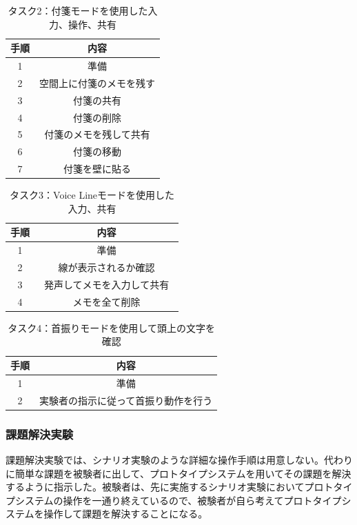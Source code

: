 \documentclass[technicalreport]{ieicej}
\begin{document}
\begin{table}[h]
\caption{タスク2：付箋モードを使用した入力、操作、共有}
\label{table:task2}
\begin{center}
\begin{tabular}{|c|c|}
\hline
手順 & 内容  \\
\hline\hline
1 & 準備  \\
\hline
2 & 空間上に付箋のメモを残す  \\
\hline
3 & 付箋の共有　\\
\hline
4 & 付箋の削除  \\
\hline
5 & 付箋のメモを残して共有  \\
\hline
6 & 付箋の移動　\\
\hline
7 & 付箋を壁に貼る \\
\hline
\end{tabular}
\end{center}
\end{table}

\begin{table}[h]
\caption{タスク3：Voice Lineモードを使用した入力、共有}
\label{table:task3}
\begin{center}
\begin{tabular}{|c|c|}
\hline
手順 & 内容  \\
\hline\hline
1 & 準備  \\
\hline
2 & 線が表示されるか確認  \\
\hline
3 & 発声してメモを入力して共有　\\
\hline
4 & メモを全て削除  \\
\hline
\end{tabular}
\end{center}
\end{table}

\begin{table}[h]
\caption{タスク4：首振りモードを使用して頭上の文字を確認}
\label{table:task4}
\begin{center}
\begin{tabular}{|c|c|}
\hline
手順 & 内容  \\
\hline\hline
1 & 準備  \\
\hline
2 & 実験者の指示に従って首振り動作を行う  \\
\hline
\end{tabular}
\end{center}
\end{table}

\subsubsection{課題解決実験}
課題解決実験では、シナリオ実験のような詳細な操作手順は用意しない。代わりに簡単な課題を被験者に出して、プロトタイプシステムを用いてその課題を解決するように指示した。被験者は、先に実施するシナリオ実験においてプロトタイプシステムの操作を一通り終えているので、被験者が自ら考えてプロトタイプシステムを操作して課題を解決することになる。
\end{document}
